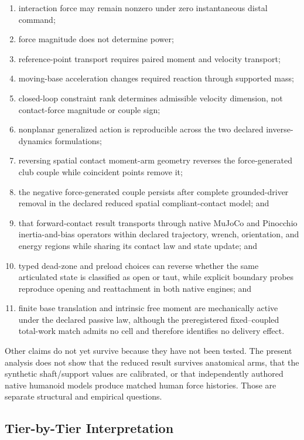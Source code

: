 \documentclass[
  letterpaper,
]{report}
\providecommand{\tightlist}{%
  \setlength{\itemsep}{0pt}\setlength{\parskip}{0pt}}
\begin{document}
\begin{enumerate}
\def\labelenumi{\arabic{enumi}.}
\tightlist
\item
  interaction force may remain nonzero under zero instantaneous distal
  command;
\item
  force magnitude does not determine power;
\item
  reference-point transport requires paired moment and velocity
  transport;
\item
  moving-base acceleration changes required reaction through supported
  mass;
\item
  closed-loop constraint rank determines admissible velocity dimension,
  not contact-force magnitude or couple sign;
\item
  nonplanar generalized action is reproducible across the two declared
  inverse-dynamics formulations;
\item
  reversing spatial contact moment-arm geometry reverses the
  force-generated club couple while coincident points remove it;
\item
  the negative force-generated couple persists after complete
  grounded-driver removal in the declared reduced spatial
  compliant-contact model; and
\item
  that forward-contact result transports through native MuJoCo and
  Pinocchio inertia-and-bias operators within declared trajectory,
  wrench, orientation, and energy regions while sharing its contact law
  and state update; and
\item
  typed dead-zone and preload choices can reverse whether the same
  articulated state is classified as open or taut, while explicit
  boundary probes reproduce opening and reattachment in both native
  engines; and
\item
  finite base translation and intrinsic free moment are mechanically
  active under the declared passive law, although the preregistered
  fixed--coupled total-work match admits no cell and therefore
  identifies no delivery effect.
\end{enumerate}

Other claims do not yet survive because they have not been tested. The
present analysis does not show that the reduced result survives
anatomical arms, that the synthetic shaft/support values are calibrated,
or that independently authored native humanoid models produce matched
human force histories. Those are separate structural and empirical
questions.

\subsection{Tier-by-Tier
Interpretation}\label{sec-ladder-tier-interpretation}
\end{document}
